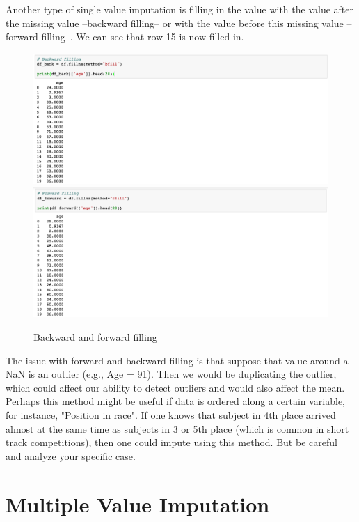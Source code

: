 \documentclass[a4paper]{article}
\begin{document}
\par\noindent Another type of single value imputation is filling in the value with the value after the missing value --backward filling-- or with the value before this missing value --forward filling--. We can see that row 15 is now filled-in.

\begin{figure}[htbp]
\centering
\includegraphics[width = \textwidth]{images/python7.png}
\includegraphics[width = \textwidth]{images/python8.png}
\caption{Backward and forward filling}
\end{figure}

\par\noindent The issue with forward and backward filling is that suppose that value around a NaN is an outlier (e.g., Age = 91). Then we would be duplicating the outlier, which could affect our ability to detect outliers and would also affect the mean. Perhaps this method might be useful if data is ordered along a certain variable, for instance, "Position in race". If one knows that subject in 4th place arrived almost at the same time as subjects in 3 or 5th place (which is common in short track competitions), then one could impute using this method. But be careful and analyze your specific case. 

\section{Multiple Value Imputation}
\end{document}
